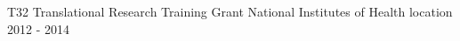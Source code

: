 

\begin{cvhonors}

  \cvhonor
    {T32 Translational Research Training Grant} %
    {National Institutes of Health} %
    {location} %
    {2012 - 2014} %

\end{cvhonors}
